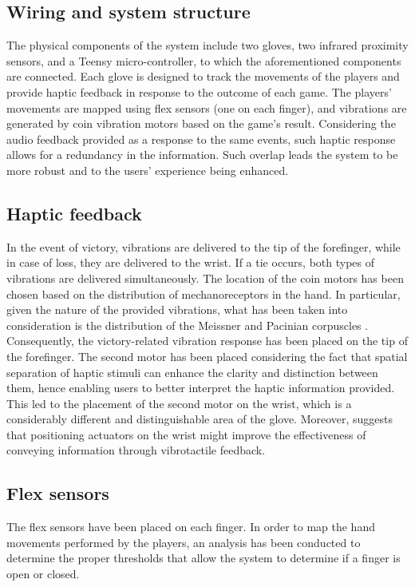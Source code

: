 \documentclass[11pt,a4paper]{report}
\begin{document}
\subsection*{Wiring and system structure}

The physical components of the system include two gloves, two infrared proximity sensors, and a Teensy micro-controller, to which the aforementioned components are connected. Each glove is designed to track the movements of the players and provide haptic feedback in response to the outcome of each game. The players' movements are mapped using flex sensors (one on each finger), and vibrations are generated by coin vibration motors based on the game's result.
Considering the audio feedback provided as a response to the same events, such haptic response allows for a redundancy in the information. Such overlap leads the system to be more robust and to the users' experience being enhanced.

\subsection*{Haptic feedback}
In the event of victory, vibrations are delivered to the tip of the forefinger, while in case of loss, they are delivered to the wrist. 
If a tie occurs, both types of vibrations are delivered simultaneously.
The location of the coin motors has been chosen based on the distribution of mechanoreceptors in the hand. In particular, given the nature of the provided vibrations, what has been taken into consideration is the distribution of the Meissner and Pacinian corpuscles \cite*{6}. 
Consequently, the victory-related vibration response has been placed on the tip of the forefinger. The second motor has been placed considering the fact that spatial separation of haptic stimuli can enhance the clarity and distinction between them, hence enabling users to better interpret the haptic information provided. This led to the placement of the second motor on the wrist, which is a considerably different and distinguishable area of the glove. 
Moreover, \cite*{7} suggests that positioning actuators on the wrist might improve the effectiveness of conveying information through vibrotactile feedback. 

\subsection*{Flex sensors}
The flex sensors have been placed on each finger. In order to map the hand movements performed by the players, an analysis has been conducted to determine the proper thresholds that allow the system to determine if a finger is open or closed.
\end{document}

